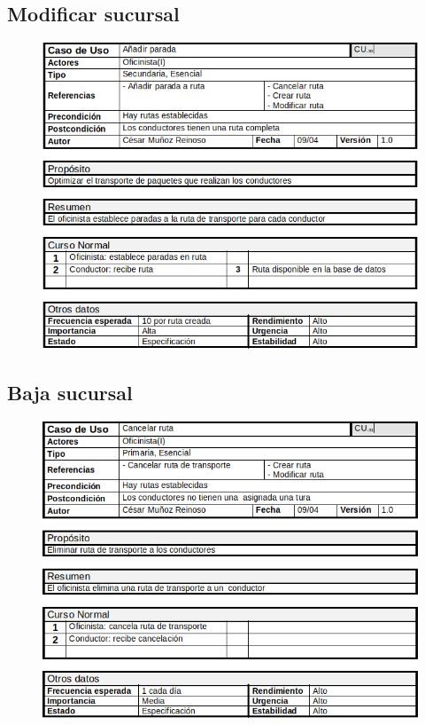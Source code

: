 \subsection{Modificar sucursal}
\begin{figure}[H]
	\centering
	\includegraphics[width=16cm]{8}
\end{figure}
\subsection{Baja sucursal}
\begin{figure}[H]
	\centering
	\includegraphics[width=16cm]{9}
\end{figure}
